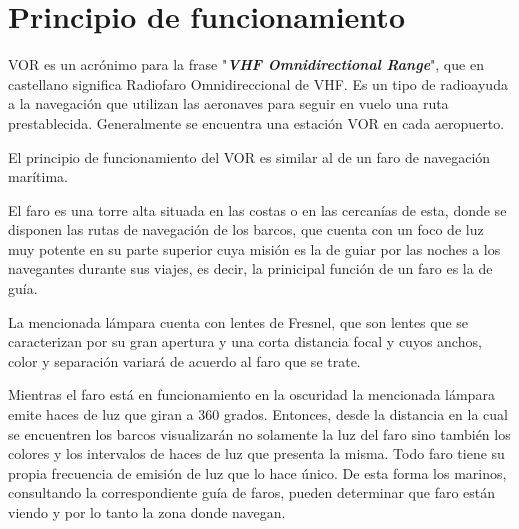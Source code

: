 \section{Principio de funcionamiento}
\label{Principio de funcionamiento}

VOR es un acr\'onimo para la frase "\textbf{\textit{VHF Omnidirectional Range}}", que en castellano significa Radiofaro Omnidireccional de VHF. Es un tipo de radioayuda a la navegaci\'on que utilizan las aeronaves para seguir en vuelo una ruta prestablecida. 
Generalmente se encuentra una estaci\'on VOR en cada aeropuerto. 


El principio de funcionamiento del VOR es similar al de un faro de navegaci\'on mar\'itima. 

El faro es una torre alta situada en las costas o en las cercanías de esta, donde se disponen las rutas de navegación de los barcos, que cuenta con un foco de luz muy potente en su parte superior cuya misión es la de guiar por las noches a los navegantes durante sus viajes, es decir, la prinicipal función de un faro es la de guía.

La mencionada lámpara cuenta con lentes de Fresnel, que son lentes que se caracterizan por su gran apertura y una corta distancia focal y cuyos anchos, color y separación variará de acuerdo al faro que se trate.

Mientras el faro está en funcionamiento en la oscuridad la mencionada lámpara emite haces de luz que giran a 360 grados. Entonces, desde la distancia en la cual se encuentren los barcos visualizarán no solamente la luz del faro sino también los colores y los intervalos de haces de luz que presenta la misma. Todo faro tiene su propia frecuencia de emisión de luz que lo hace único. De esta forma los marinos, consultando la correspondiente guía de faros, pueden determinar que faro están viendo y por lo tanto la zona donde navegan. 

